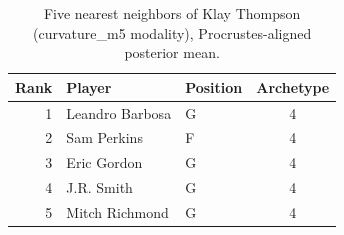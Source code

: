 \begin{table}[htbp]
  \centering\small
  \begin{tabular}{rllc}
    \toprule
    Rank & Player & Position & Archetype \\
    \midrule
    1 & Leandro Barbosa & G & 4 \\
    2 & Sam Perkins & F & 4 \\
    3 & Eric Gordon & G & 4 \\
    4 & J.R. Smith & G & 4 \\
    5 & Mitch Richmond & G & 4 \\
    \bottomrule
  \end{tabular}
  \caption{Five nearest neighbors of Klay Thompson (curvature_m5 modality), Procrustes-aligned posterior mean.}
  \label{tab:Klay_Thompson_neighbors_curvature_m5}
\end{table}

